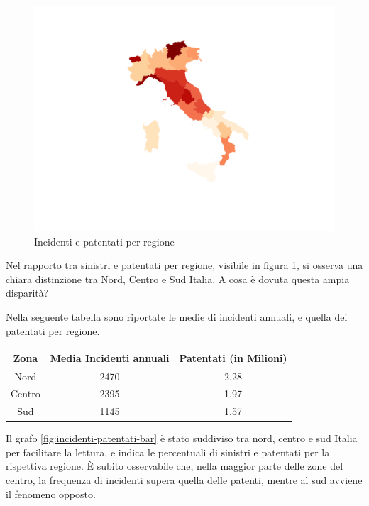 \documentclass[a4paper,12pt]{report}
\begin{document}
\begin{figure}
    \hfill\includegraphics[width=\linewidth]{../src/incidenti/incidenti_aci/mappe_regioni/incidenti_patenti_italia.png}\hspace*{\fill}
    \caption{Incidenti e patentati per regione}
    \label{fig:incidenti-patentati}
\end{figure}

Nel rapporto tra sinistri e patentati per regione, 
visibile in figura \ref{fig:incidenti-patentati}, 
si osserva una chiara distinzione tra Nord, Centro e Sud Italia. 
A cosa è dovuta questa ampia disparità?

Nella seguente tabella sono riportate le medie di incidenti annuali, 
e quella dei patentati per regione. 

\begin{center}
    \def\arraystretch{1.5}%
    \begin{tabular}{ |c|c|c| } 
    \hline
    Zona & Media Incidenti annuali & Patentati (in Milioni) \\ 
    \hline
    \rowcolor{TableGray}
    Nord    &   2470 &   2.28 \\ 
    Centro  &   2395 &   1.97 \\ 
    \rowcolor{TableGray}
    Sud     &   1145 &   1.57 \\ 
    \hline
    \end{tabular}
\end{center}

Il grafo \ref{fig:incidenti-patentati-bar} è stato suddiviso tra nord, 
centro e sud Italia per facilitare la lettura, e indica le percentuali di sinistri e 
patentati per la rispettiva regione. 
\`E subito osservabile che, nella maggior parte delle zone del centro, 
la frequenza di incidenti supera quella delle patenti, 
mentre al sud avviene il fenomeno opposto. 
\end{document}
